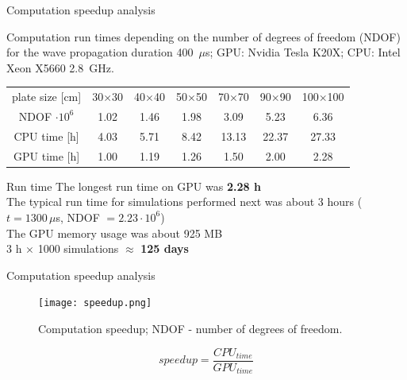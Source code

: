 \documentclass[10pt]{beamer} %
\begin{document}
\begin{frame}{Computation speedup analysis}
	\begin{table}
		\renewcommand{\arraystretch}{1.3}
		\centering \small
		Computation run times depending on the number of degrees of freedom (NDOF) for the wave propagation duration 400~$\mu$s; GPU: Nvidia Tesla K20X; CPU: Intel Xeon X5660 2.8~GHz.
		
		\begin{tabular}{ccccccc} 
			\toprule	
			plate size [cm] & 30$\times$30  & 40$\times$40 & 50$\times$50 & 70$\times$70 & 90$\times$90 & 100$\times$100 \\
			NDOF $\cdot 10^6$ & 1.02  & 1.46 & 1.98 & 3.09 & 5.23 & 6.36 \\
			\midrule
			CPU time [h]& 4.03& 5.71 & 8.42 & 13.13 & 22.37 & 27.33\\
			\midrule
			GPU time [h]& 1.00& 1.19 & 1.26 & 1.50 & 2.00 & 2.28\\
			\bottomrule 
		\end{tabular} 
		\label{tab:run_time}
	\end{table}
	\begin{alertblock}{Run time}
		The longest run time on GPU was \textbf{2.28 h}\\
		The typical run time for simulations performed next was about 3 hours ($t = 1300\, \mu$s, NDOF $= 2.23\cdot 10^6$) \\
		The GPU memory usage was about 925 MB\\
		3 h $\times$ 1000 simulations $\approx$ \textbf{125 days}
	\end{alertblock}
\end{frame}
\begin{frame}{Computation speedup analysis}
	\begin{figure} [h!]
		\centering
		\texttt{[image: speedup.png]}	
		\caption{Computation speedup; NDOF - number of degrees of freedom.}
		\label{fig:speedup}
	\end{figure}
	\begin{equation*}
	speedup = \frac{CPU_{time}}{GPU_{time}}
	\label{eq:speedup}
	\end{equation*}
\end{frame}
\end{document}
